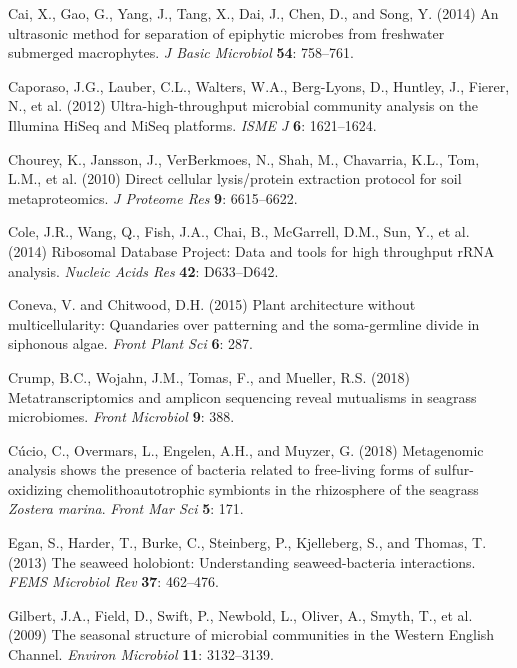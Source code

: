 \documentclass[
  12pt,
]{article}
\begin{document}
\leavevmode\hypertarget{ref-Cai2014}{}%
Cai, X., Gao, G., Yang, J., Tang, X., Dai, J., Chen, D., and Song, Y.
(2014) An ultrasonic method for separation of epiphytic microbes from
freshwater submerged macrophytes. \emph{J Basic Microbiol} \textbf{54}:
758--761.

\leavevmode\hypertarget{ref-Caporaso2012}{}%
Caporaso, J.G., Lauber, C.L., Walters, W.A., Berg-Lyons, D., Huntley,
J., Fierer, N., et al. (2012) Ultra-high-throughput microbial community
analysis on the Illumina HiSeq and MiSeq platforms. \emph{ISME J}
\textbf{6}: 1621--1624.

\leavevmode\hypertarget{ref-Chourey2010}{}%
Chourey, K., Jansson, J., VerBerkmoes, N., Shah, M., Chavarria, K.L.,
Tom, L.M., et al. (2010) Direct cellular lysis/protein extraction
protocol for soil metaproteomics. \emph{J Proteome Res} \textbf{9}:
6615--6622.

\leavevmode\hypertarget{ref-Cole2014}{}%
Cole, J.R., Wang, Q., Fish, J.A., Chai, B., McGarrell, D.M., Sun, Y., et
al. (2014) Ribosomal Database Project: Data and tools for high
throughput rRNA analysis. \emph{Nucleic Acids Res} \textbf{42}:
D633--D642.

\leavevmode\hypertarget{ref-Coneva2015}{}%
Coneva, V. and Chitwood, D.H. (2015) Plant architecture without
multicellularity: Quandaries over patterning and the soma-germline
divide in siphonous algae. \emph{Front Plant Sci} \textbf{6}: 287.

\leavevmode\hypertarget{ref-Crump2018}{}%
Crump, B.C., Wojahn, J.M., Tomas, F., and Mueller, R.S. (2018)
Metatranscriptomics and amplicon sequencing reveal mutualisms in
seagrass microbiomes. \emph{Front Microbiol} \textbf{9}: 388.

\leavevmode\hypertarget{ref-Cucio2018}{}%
Cúcio, C., Overmars, L., Engelen, A.H., and Muyzer, G. (2018)
Metagenomic analysis shows the presence of bacteria related to
free-living forms of sulfur-oxidizing chemolithoautotrophic symbionts in
the rhizosphere of the seagrass \emph{Zostera marina}. \emph{Front Mar
Sci} \textbf{5}: 171.

\leavevmode\hypertarget{ref-Egan2013}{}%
Egan, S., Harder, T., Burke, C., Steinberg, P., Kjelleberg, S., and
Thomas, T. (2013) The seaweed holobiont: Understanding seaweed-bacteria
interactions. \emph{FEMS Microbiol Rev} \textbf{37}: 462--476.

\leavevmode\hypertarget{ref-Gilbert2009}{}%
Gilbert, J.A., Field, D., Swift, P., Newbold, L., Oliver, A., Smyth, T.,
et al. (2009) The seasonal structure of microbial communities in the
Western English Channel. \emph{Environ Microbiol} \textbf{11}:
3132--3139.
\end{document}
